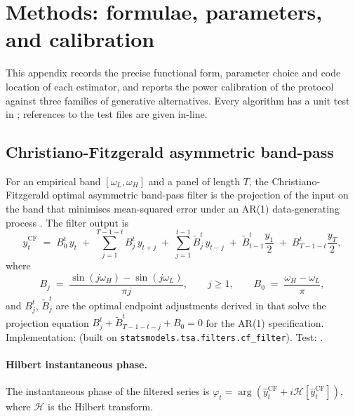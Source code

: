 \section{Methods: formulae, parameters, and calibration}
\label{app:methods}

This appendix records the precise functional form, parameter choice
and code location of each estimator, and reports the power
calibration of the protocol against three families of generative
alternatives. Every algorithm has a unit test in
; references to the test files are given
in-line.

\subsection{Christiano-Fitzgerald asymmetric band-pass}

For an empirical band \([\omega_L,\omega_H]\) and a panel of
length \(T\), the Christiano-Fitzgerald optimal asymmetric
band-pass filter is the projection of the input on the band that
minimises mean-squared error under an AR(1) data-generating
process \citep{christiano_fitzgerald2003}. The filter output is
\begin{equation}
\hat y^{\mathrm{CF}}_t \;=\; B^t_0\,y_t
   \;+\; \sum_{j=1}^{T-1-t} B^t_j\,y_{t+j}
   \;+\; \sum_{j=1}^{t-1} \tilde B^t_j\,y_{t-j}
   \;+\; \tilde B^t_{t-1}\frac{y_1}{2}
   \;+\; B^t_{T-1-t}\frac{y_T}{2},
\label{eq:cf}
\end{equation}
where
\begin{equation}
B_j \;=\; \frac{\sin(j\omega_H)-\sin(j\omega_L)}{\pi j},
\qquad j\geq 1,\qquad
B_0 \;=\; \frac{\omega_H-\omega_L}{\pi},
\end{equation}
and \(B^t_j\), \(\tilde B^t_j\) are the optimal endpoint
adjustments derived in \citet[Appendix~3.1]{christiano_fitzgerald2003}
that solve the projection equation
\(B^t_j + \tilde B^t_{T-1-t-j} + B_0 = 0\) for the AR(1)
specification. Implementation:
 (built on
\texttt{statsmodels.tsa.filters.cf\_filter}). Test:
.

\paragraph{Hilbert instantaneous phase.}
The instantaneous phase of the filtered series is
\(\varphi_t = \arg(\hat y^{\mathrm{CF}}_t + i\mathcal{H}[\hat y^{\mathrm{CF}}_t])\),
where \(\mathcal{H}\) is the Hilbert transform.

